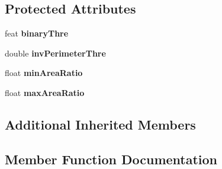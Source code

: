 \subsection*{Protected Attributes}
\begin{DoxyCompactItemize}
\item 
\hypertarget{classBKGCutDetector_ad1f1988badcfe3f8b6341e0ad7d40e9c}{}feat {\bfseries binary\+Thre}\label{classBKGCutDetector_ad1f1988badcfe3f8b6341e0ad7d40e9c}

\item 
\hypertarget{classBKGCutDetector_a51de970ae40887927077e27092b3d2f4}{}double {\bfseries inv\+Perimeter\+Thre}\label{classBKGCutDetector_a51de970ae40887927077e27092b3d2f4}

\item 
\hypertarget{classBKGCutDetector_a2184787ed50fbe8f30d1a8ef88cb3cc3}{}float {\bfseries min\+Area\+Ratio}\label{classBKGCutDetector_a2184787ed50fbe8f30d1a8ef88cb3cc3}

\item 
\hypertarget{classBKGCutDetector_aea66427f38ba877edf1cac44a242c797}{}float {\bfseries max\+Area\+Ratio}\label{classBKGCutDetector_aea66427f38ba877edf1cac44a242c797}

\end{DoxyCompactItemize}
\subsection*{Additional Inherited Members}


\subsection{Member Function Documentation}
\hypertarget{classBKGCutDetector_aae6a1f123251f5fd1fddce6e8828b36a}{}

